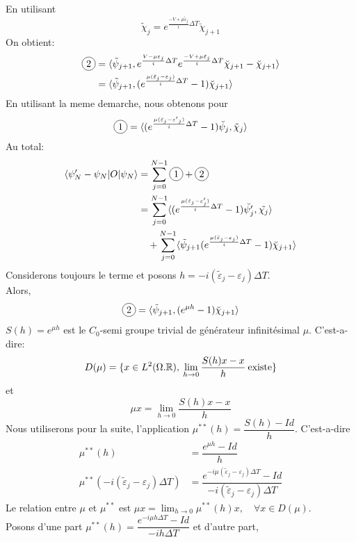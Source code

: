En utilisant
\begin{equation}
\tilde{\chi}_j = e^{\frac{-V+\mu\tilde{\varepsilon}_j}{i}\Delta T}  \breve{\chi}_{j+1}
\end{equation}
On obtient:
\begin{align*}
\circled{2} 
&= \langle \tilde{\psi}_{j+1}, e^{\frac{V-\mu\varepsilon_j}{i}\Delta T} e^{\frac{-V+\mu\tilde{\varepsilon}_j}{i}\Delta T}  \breve{\chi}_{j+1} - \breve{\chi}_{j+1} \rangle\\
&= \langle \tilde{\psi}_{j+1}, (e^{\frac{\mu (\tilde{\varepsilon}_j-\varepsilon_j)}{i}\Delta T} -1) \breve{\chi}_{j+1} \rangle
\end{align*}
En utilisant la meme demarche, nous obtenons pour 
$$
\circled{1} = \langle (e^{\frac{\mu (\tilde{\varepsilon}_j-{\varepsilon'}_j)}{i}\Delta T} -1) \breve{\psi}_{j},  \tilde{\chi}_{j} \rangle
$$
Au total:
\begin{align*}
\langle \psi'_N-\psi_N |O|\psi_N \rangle 
&=\sum_{j=0}^{N-1} \circled{1}+\circled{2}\\
&= \sum_{j=0}^{N-1} \langle (e^{\frac{\mu(\tilde{\varepsilon}_j-\varepsilon'_j)}{i}\Delta T}-1)\breve{\psi'_j} , \tilde{\chi_j} \rangle\\
&\quad +\sum_{j=0}^{N-1} \langle \tilde{\psi}_{j+1} (e^{\frac{\mu(\tilde{\varepsilon}_j-\varepsilon_j)}{i}\Delta T}-1)\breve{\chi}_{j+1} \rangle
\end{align*}
Considerons toujours le terme  et posons $h=-i(\tilde{\varepsilon}_j-\varepsilon_j)\Delta T$.\\
Alors,
$$
\circled{2}=\langle \tilde{\psi}_{j+1},(e^{\mu h}-1)\breve{\chi}_{j+1} \rangle
$$
$S(h)=e^{\mu h}$ est le $C_0$-semi groupe trivial de générateur infinitésimal $\mu$. C'est-a-dire:
$$
D(\mu)=\{x\in L^2(\Omega. \mathbb R), \: \lim_{h \rightarrow 0} \dfrac{S(h)x-x}{h} \: \mbox{existe}\}
$$
et
$$
\mu x = \lim_{h \rightarrow 0} \dfrac{S(h)x-x}{h}
$$
Nous utiliserons pour la suite, l'application $\mu^{**}(h)= \dfrac{S(h)-Id}{h}$. C'est-a-dire
\begin{align*}
\mu^{**}(h) &= \dfrac{e^{\mu h}-Id}{h}\\
\mu^{**}(-i(\tilde{\varepsilon}_j-\varepsilon_j)\Delta T) &= \dfrac{e^{-i\mu (\tilde{\varepsilon}_j-\varepsilon_j)\Delta T}-Id}{-i(\tilde{\varepsilon}_j-\varepsilon_j)\Delta T}
\end{align*}
Le relation entre $\mu$ et $\mu^{**}$ est $\mu x = \lim_{h \rightarrow 0} \mu^{**}(h)x, \quad \forall x \in D(\mu)$.\\
Posons d'une part $\mu^{**}(h)=\dfrac{e^{-i\mu h\Delta T}-Id}{-ih\Delta T}$ et d'autre part,
